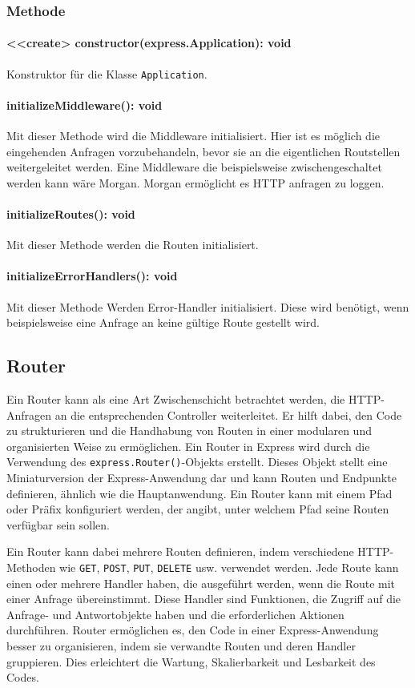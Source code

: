 \documentclass{entwurfsheft}
\begin{document}
\subsubsection*{Methode}
\paragraph{<<create> constructor(express.Application): void}
Konstruktor für die Klasse \texttt{Application}.
\paragraph{initializeMiddleware(): void}
Mit dieser Methode wird die Middleware initialisiert. Hier ist es möglich die eingehenden Anfragen vorzubehandeln, bevor sie an die eigentlichen Routstellen weitergeleitet werden.
Eine Middleware die beispielsweise zwischengeschaltet werden kann wäre Morgan. Morgan ermöglicht es HTTP anfragen zu loggen.
\paragraph{initializeRoutes(): void}
Mit dieser Methode werden die Routen initialisiert.
\paragraph{initializeErrorHandlers(): void}
Mit dieser Methode Werden Error-Handler initialisiert. Diese wird benötigt, wenn beispielsweise eine Anfrage an keine gültige Route gestellt wird.

\newpage

\subsection{Router}
Ein Router kann als eine Art Zwischenschicht betrachtet werden, die HTTP-Anfragen an die entsprechenden Controller weiterleitet.
Er hilft dabei, den Code zu strukturieren und die Handhabung von Routen in einer modularen und organisierten Weise zu ermöglichen.
Ein Router in Express wird durch die Verwendung des \texttt{express.Router()}-Objekts erstellt.
Dieses Objekt stellt eine Miniaturversion der Express-Anwendung dar und kann Routen und Endpunkte definieren, ähnlich wie die Hauptanwendung.
Ein Router kann mit einem Pfad oder Präfix konfiguriert werden, der angibt, unter welchem Pfad seine Routen verfügbar sein sollen.

Ein Router kann dabei mehrere Routen definieren, indem verschiedene HTTP-Methoden wie \texttt{GET}, \texttt{POST}, \texttt{PUT}, \texttt{DELETE} usw. verwendet werden.
Jede Route kann einen oder mehrere Handler haben, die ausgeführt werden, wenn die Route mit einer Anfrage übereinstimmt.
Diese Handler sind Funktionen, die Zugriff auf die Anfrage- und Antwortobjekte haben und die erforderlichen Aktionen durchführen.
Router ermöglichen es, den Code in einer Express-Anwendung besser zu organisieren, indem sie verwandte Routen und deren Handler gruppieren.
Dies erleichtert die Wartung, Skalierbarkeit und Lesbarkeit des Codes.
\end{document}
